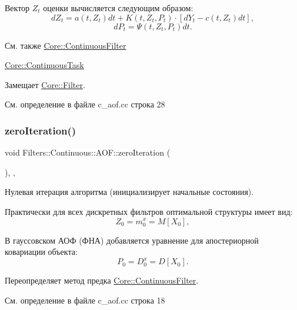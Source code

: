 Вектор $Z_t$ оценки вычисляется следующим образом\+: \[dZ_t = a(t,Z_t)dt + K(t,Z_t, P_t)\cdot [ dY_t - c(t,Z_t)dt],\] \[dP_t = \Psi(t,Z_t,P_t)dt.\]

\begin{DoxySeeAlso}{См. также}
\hyperlink{class_core_1_1_continuous_filter}{Core\+::\+Continuous\+Filter} 

\hyperlink{class_core_1_1_continuous_task}{Core\+::\+Continuous\+Task} 
\end{DoxySeeAlso}


Замещает \hyperlink{class_core_1_1_filter_a438681ee3e54aba2148042d9f8011ab8}{Core\+::\+Filter}.



См. определение в файле c\+\_\+aof.\+cc строка 28

\hypertarget{class_filters_1_1_continuous_1_1_a_o_f_ab416b56dbeb26366f495f03b3c08ad5e}{}\label{class_filters_1_1_continuous_1_1_a_o_f_ab416b56dbeb26366f495f03b3c08ad5e} 
\subsubsection{\texorpdfstring{zero\+Iteration()}{zeroIteration()}}
{\footnotesize\ttfamily void Filters\+::\+Continuous\+::\+A\+O\+F\+::zero\+Iteration (\begin{DoxyParamCaption}{ }\end{DoxyParamCaption})\hspace{0.3cm}{\ttfamily [override]}, {\ttfamily [protected]}, {\ttfamily [virtual]}}



Нулевая итерация алгоритма (инициализирует начальные состояния). 

Практически для всех дискретных фильтров оптимальной структуры имеет вид\+: \[Z_0 = m_0^x = M[X_0],\]

В гауссовском АОФ (ФНА) добавляется уравнение для апостериорной ковариации объекта\+: \[P_0 = D_0^x = D[X_0].\] 

Переопределяет метод предка \hyperlink{class_core_1_1_continuous_filter_a4c30983f9354344717538f807855f2ae}{Core\+::\+Continuous\+Filter}.



См. определение в файле c\+\_\+aof.\+cc строка 18




